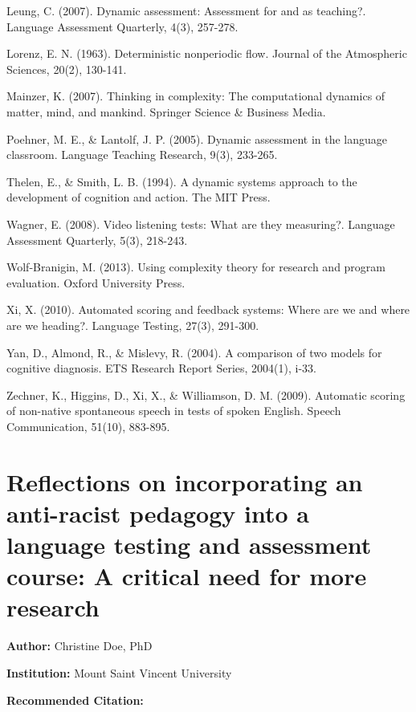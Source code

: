 \documentclass[
]{book}
\begin{document}
Leung, C. (2007). Dynamic assessment: Assessment for and as teaching?. Language Assessment Quarterly, 4(3), 257-278.

Lorenz, E. N. (1963). Deterministic nonperiodic flow. Journal of the Atmospheric Sciences, 20(2), 130-141.

Mainzer, K. (2007). Thinking in complexity: The computational dynamics of matter, mind, and mankind. Springer Science \& Business Media.

Poehner, M. E., \& Lantolf, J. P. (2005). Dynamic assessment in the language classroom. Language Teaching Research, 9(3), 233-265.

Thelen, E., \& Smith, L. B. (1994). A dynamic systems approach to the development of cognition and action. The MIT Press.

Wagner, E. (2008). Video listening tests: What are they measuring?. Language Assessment Quarterly, 5(3), 218-243.

Wolf-Branigin, M. (2013). Using complexity theory for research and program evaluation. Oxford University Press.

Xi, X. (2010). Automated scoring and feedback systems: Where are we and where are we heading?. Language Testing, 27(3), 291-300.

Yan, D., Almond, R., \& Mislevy, R. (2004). A comparison of two models for cognitive diagnosis. ETS Research Report Series, 2004(1), i-33.

Zechner, K., Higgins, D., Xi, X., \& Williamson, D. M. (2009). Automatic scoring of non-native spontaneous speech in tests of spoken English. Speech Communication, 51(10), 883-895.

\newpage

\hypertarget{reflections-on-incorporating-an-anti-racist-pedagogy-into-a-language-testing-and-assessment-course-a-critical-need-for-more-research}{%
\section{Reflections on incorporating an anti-racist pedagogy into a language testing and assessment course: A critical need for more research}\label{reflections-on-incorporating-an-anti-racist-pedagogy-into-a-language-testing-and-assessment-course-a-critical-need-for-more-research}}

\textbf{Author:} Christine Doe, PhD

\textbf{Institution:} Mount Saint Vincent University

\textbf{Recommended Citation:}
\end{document}
